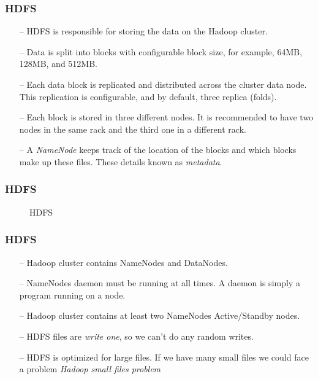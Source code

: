 \begin{frame}[c]{ }
	\frametitle{HDFS }
	
	
	\begin{itemize}  [<+->]
		\item [--] {\footnotesize HDFS is responsible for storing the data on the Hadoop cluster.}
		\item [--] {\footnotesize Data is split into blocks with configurable block size, for example, 64MB, 128MB, and 512MB.}
		\item [--] {\footnotesize Each data block is replicated and distributed across the cluster data node. This replication is configurable, and by default, three replica (folds).}
		\item [--] {\footnotesize Each block is stored in three different nodes. It is recommended to have two nodes in the same rack and the third one in a different rack.}
		\item [--] {\footnotesize A \textit{NameNode} keeps track of the location of the blocks and which blocks make up these files. These details known as \textit{metadata}.}
	\end{itemize}
\end{frame}
\begin{frame}[c]{ }
	\frametitle{HDFS }
		\begin{figure}
		\centering
		
		\caption{HDFS } \label{fig:hdfs}
	\end{figure}
\end{frame}
\begin{frame}[c]{ }
	\frametitle{HDFS }
	
	
	\begin{itemize}  [<+->]
		\item [--] {\footnotesize Hadoop cluster contains NameNodes and DataNodes.}
		\item [--] {\footnotesize NameNodes daemon must be running at all times. A daemon is simply a program running on a node. }
		\item [--] {\footnotesize Hadoop cluster contains at least two NameNodes Active/Standby nodes.}
		\item [--] {\footnotesize HDFS files are \textit{write one}, so we can't do any random writes.}
		\item [--] {\footnotesize HDFS is optimized for large files. If we have many small files we could face a problem \textit{Hadoop small files problem}}
			\end{itemize}
		
\end{frame}
